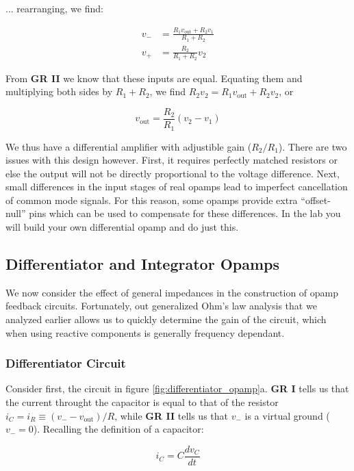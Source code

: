 \documentclass[]{article}
\begin{document}
\noindent ... rearranging, we find:

\begin{align}
v_- &= \frac{R_1v_\text{out} + R_2v_1}{R_1+R_2} \\
v_+ &= \frac{R_2}{R_1+R_2}v_2
\end{align}



From \textbf{GR II} we know that these inputs are equal. Equating them and multiplying both sides by $R_1 + R_2$, we find $R_2v_2 = R_1v_\text{out} + R_2v_2$, or

\begin{equation}
\label{eq:differential_opamp}
v_\text{out} = \frac{R_2}{R_1}\left(v_2-v_1\right)
\end{equation}

We thus have a differential amplifier with adjustible gain ($R_2/R_1$). There are two issues with this design however. First, it requires perfectly matched resistors or else the output will not be directly proportional to the voltage difference. Next, small differences in the input stages of real opamps lead to imperfect cancellation of common mode signals. For this reason, some opamps provide extra ``offset-null'' pins which can be used to compensate for these differences. In the lab you will build your own differential opamp and do just this.

\subsection{Differentiator and Integrator Opamps}
We now consider the effect of general impedances in the construction of opamp feedback circuits. Fortunately, out generalized Ohm's law analysis that we analyzed earlier allows us to quickly determine the gain of the circuit, which when using reactive components is generally frequency dependant. 

\subsubsection{Differentiator Circuit}
Consider first, the circuit in figure \ref{fig:differentiator_opamp}a. \textbf{GR I} tells us that the current throught the capacitor is equal to that of the resistor $i_C = i_R \equiv \left(v_--v_\text{out}\right)/R$, while \textbf{GR II} tells us that $v_-$ is a virtual ground ($v_- = 0$). Recalling the definition of a capacitor:

\begin{equation}
\label{eq:defn_capacitor_rep}
i_C = C\frac{dv_C}{dt}
\end{equation}
\end{document}
